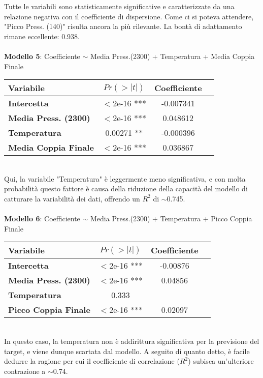 \documentclass[fleqn,10pt]{SelfArx} %
\begin{document}
Tutte le variabili sono statisticamente significative e caratterizzate da una relazione negativa con il coefficiente di dispersione. Come ci si poteva attendere, "Picco Press. (140)" risulta ancora la più rilevante. La bontà di adattamento rimane eccellente: 0.938.\\
\\
\textbf{Modello 5}:  Coefficiente $\sim$ Media Press.(2300) + Temperatura + Media Coppia Finale
{\begin{table}[h] 
\centering
\begin{tabular}[t]{lccc}
\toprule 
Variabile&$Pr(> |t|)$&Coefficiente\\
\midrule 
\textbf{Intercetta}&$<$2e-16 ***&-0.007341\\ 
\textbf{Media Press. (2300)}&$<$2e-16 ***&0.048612\\
\textbf{Temperatura}&0.00271 **&-0.000396\\
\textbf{Media Coppia Finale}&$<$2e-16 ***&0.036867\\
\bottomrule 
\end{tabular}
\end{table}}\\
Qui, la variabile "Temperatura" è leggermente meno significativa, e con molta probabilità questo fattore è causa della riduzione della capacità del modello di catturare la variabilità dei dati, offrendo un $R^2$ di $\sim$0.745.\\
\\
\textbf{Modello 6}: Coefficiente $\sim$ Media Press.(2300) + Temperatura + Picco Coppia Finale
{\begin{table}[h] 
\centering
\begin{tabular}[t]{lccc}
\toprule 
Variabile&$Pr(> |t|)$&Coefficiente\\
\midrule 
\textbf{Intercetta}&$<$2e-16 ***&-0.00876\\ 
\textbf{Media Press. (2300)}&$<$2e-16 ***&0.04856\\
\textbf{Temperatura}&0.333\\
\textbf{Picco Coppia Finale}&$<$2e-16 ***&0.02097\\
\bottomrule 
\end{tabular}
\end{table}}\\
In questo caso, la temperatura non è addirittura significativa per la previsione del target, e viene dunque scartata dal modello. A seguito di quanto detto, è facile dedurre la ragione per cui il coefficiente di correlazione ($R^2$) subisca un'ulteriore contrazione a $\sim$0.74.\\
\end{document}
